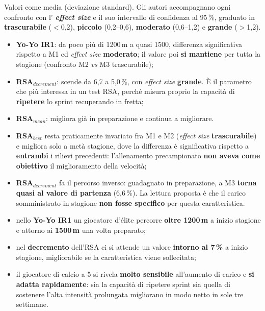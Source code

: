 Valori come media (deviazione standard). Gli autori accompagnano ogni confronto con l'\textbf{
\textit{effect size}} e il suo intervallo di confidenza al 95\,\%, graduato in
\textbf{trascurabile} ($<$0,2), \textbf{piccolo} (0,2--0,6), \textbf{moderato} (0,6--1,2) e
\textbf{grande} ($>$1,2).

\begin{itemize}
  \item \textbf{Yo-Yo IR1}: da poco più di 1200\,m a quasi 1500, differenza significativa rispetto
    a M1 ed \textit{effect size} \textbf{moderato}; il valore poi \textbf{si mantiene} per tutta la
    stagione (confronto M2 \textit{vs} M3 trascurabile);
  \item \textbf{RSA$_{decrement}$}: scende da 6,7 a 5,0\,\%, con \textit{effect size}
    \textbf{grande}. È il parametro che più interessa in un test RSA, perché misura proprio la
    capacità di \textbf{ripetere} lo sprint recuperando in fretta;
  \item \textbf{RSA$_{mean}$}: migliora già in preparazione e continua a migliorare.
\end{itemize}

\begin{itemize}
  \item \textbf{RSA$_{best}$} resta praticamente invariato fra M1 e M2 (\textit{effect size}
    \textbf{trascurabile}) e migliora solo a metà stagione, dove la differenza è significativa
    rispetto a \textbf{entrambi} i rilievi precedenti: l'allenamento precampionato \textbf{non
    aveva come obiettivo} il miglioramento della velocità;
  \item \textbf{RSA$_{decrement}$} fa il percorso inverso: guadagnato in preparazione, a M3
    \textbf{torna quasi al valore di partenza} (6,6\,\%). La lettura proposta è che il carico
    somministrato in stagione \textbf{non fosse specifico} per questa caratteristica.
\end{itemize}

\begin{itemize}
  \item nello \textbf{Yo-Yo IR1} un giocatore d'élite percorre \textbf{oltre 1200\,m} a inizio
    stagione e attorno ai \textbf{1500\,m} una volta preparato;
  \item nel \textbf{decremento} dell'RSA ci si attende un valore \textbf{intorno al 7\,\%} a inizio
    stagione, migliorabile se la caratteristica viene sollecitata;
  \item il giocatore di calcio a 5 si rivela \textbf{molto sensibile} all'aumento di carico e
    \textbf{si adatta rapidamente}: sia la capacità di ripetere sprint sia quella di sostenere
    l'alta intensità prolungata migliorano in modo netto in sole tre settimane.
\end{itemize}

